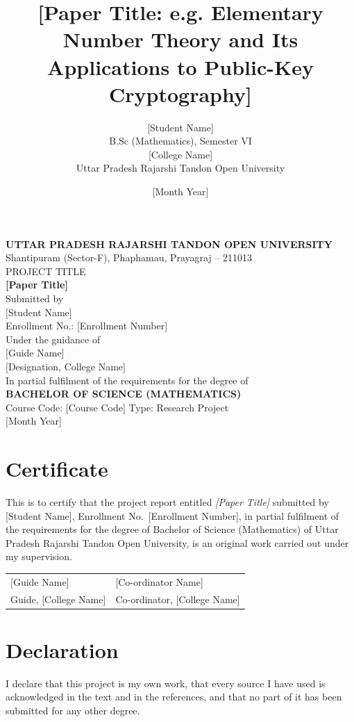 \documentclass[12pt,a4paper]{report}
\title{\textbf{[Paper Title: e.g. Elementary Number Theory and Its Applications to Public-Key Cryptography]}}
\author{[Student Name]\\[2pt]B.Sc (Mathematics), Semester VI\\[2pt][College Name]\\[2pt]Uttar Pradesh Rajarshi Tandon Open University}
\date{[Month Year]}
\theoremstyle{plain}
\theoremstyle{definition}
\theoremstyle{remark}
\begin{document}
\begin{titlepage}
  \centering
  {\Large\bfseries UTTAR PRADESH RAJARSHI TANDON OPEN UNIVERSITY}\\[6pt]
  {\normalsize Shantipuram (Sector-F), Phaphamau, Prayagraj -- 211013}\\[1.5cm]
  {\large PROJECT TITLE}\\[4pt]
  {\LARGE\bfseries [Paper Title]}\\[1.2cm]
  {\large Submitted by}\\[4pt]
  {\Large [Student Name]}\\[2pt]
  {Enrollment No.: [Enrollment Number]}\\[1cm]
  {\large Under the guidance of}\\[4pt]
  {\Large [Guide Name]}\\[2pt]
  {[Designation, College Name]}\\[1.2cm]
  {\large In partial fulfilment of the requirements for the degree of}\\[4pt]
  {\Large\bfseries BACHELOR OF SCIENCE (MATHEMATICS)}\\[6pt]
  {Course Code: [Course Code] \quad Type: Research Project}\\[1.5cm]
  {[Month Year]}
\end{titlepage}

\chapter*{Certificate}
This is to certify that the project report entitled \emph{[Paper Title]} submitted by [Student Name], Enrollment No.\ [Enrollment Number], in partial fulfilment of the requirements for the degree of Bachelor of Science (Mathematics) of Uttar Pradesh Rajarshi Tandon Open University, is an original work carried out under my supervision.

\vspace{2.5cm}
\noindent\begin{tabular}{p{7cm}p{7cm}}
[Guide Name] & [Co-ordinator Name]\\
Guide, [College Name] & Co-ordinator, [College Name]
\end{tabular}

\chapter*{Declaration}
I declare that this project is my own work, that every source I have used is acknowledged in the text and in the references, and that no part of it has been submitted for any other degree.
\end{document}
